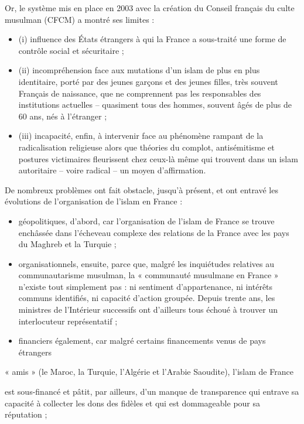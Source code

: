 Or, le système mis en place en 2003 avec la création du Conseil français
du culte musulman (CFCM) a montré ses limites :


\begin{itemize}
\item
  (i) influence des États étrangers à qui la France a sous-traité une
  forme de contrôle social et sécuritaire ;
\item
  (ii) incompréhension face aux mutations d'un islam de plus en plus
  identitaire, porté par des jeunes garçons et des jeunes filles, très
  souvent Français de naissance, que ne comprennent pas les responsables
  des institutions actuelles -- quasiment tous des hommes, souvent âgés
  de plus de 60 ans, nés à l'étranger ;
\item
  (iii) incapacité, enfin, à intervenir face au phénomène rampant de la
  radicalisation religieuse alors que théories du complot, antisémitisme
  et postures victimaires fleurissent chez ceux-là même qui trouvent
  dans un islam autoritaire -- voire radical -- un moyen d'affirmation.
\end{itemize}


De nombreux problèmes ont fait obstacle, jusqu'à présent, et ont entravé
les évolutions de l'organisation de l'islam en France :


\begin{itemize}
\item
  géopolitiques, d'abord, car l'organisation de l'islam de France se
  trouve enchâssée dans l'écheveau complexe des relations de la France
  avec les pays du Maghreb et la Turquie ;
\item
  organisationnels, ensuite, parce que, malgré les inquiétudes relatives
  au communautarisme musulman, la « communauté musulmane en France »
  n'existe tout simplement pas : ni sentiment d'appartenance, ni
  intérêts communs identifiés, ni capacité d'action groupée. Depuis
  trente ans, les ministres de l'Intérieur successifs ont d'ailleurs
  tous échoué à trouver un interlocuteur représentatif ;
\item
  financiers également, car malgré certains financements venus de pays
  étrangers
\end{itemize}

« amis » (le Maroc, la Turquie, l'Algérie et l'Arabie Saoudite), l'islam
de France




est sous-financé et pâtit, par ailleurs, d'un manque de transparence qui
entrave sa capacité à collecter les dons des fidèles et qui est
dommageable pour sa réputation ;


